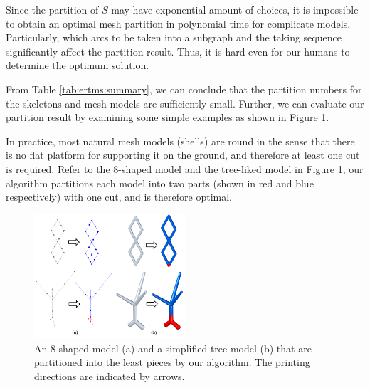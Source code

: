 Since the partition of $S$ may have exponential amount of choices, it is impossible to obtain an optimal mesh partition in polynomial time for complicate models. Particularly, which arcs to be taken into a subgraph and the taking sequence significantly affect the partition result. Thus, it is hard even for our humans to determine the optimum solution. {\color{blue}{In solving such an intricate problem involving various parameters, Monte Carlo Method with a large number of iterations is a good choice. To guarantee that the method can converge to a nice result within limited number of iterations, we apply a training-and-learning procedure, which helps accelerate the searching process. } From Table \ref{tab:ertms:summary}, we can conclude that the partition numbers for the skeletons and mesh models are sufficiently small. Further, we can evaluate our partition result by examining some simple examples as shown in Figure \ref{fig:simpletree}.

In practice, most natural mesh models (shells) are round in the sense that there is no flat platform for supporting it on the ground, and therefore at least one cut is required. Refer to the 8-shaped model and the tree-liked model in Figure \ref{fig:simpletree}, our algorithm partitions each model into two parts (shown in red and blue respectively) with one cut, and is therefore optimal.

\begin{figure}[tbp]
  \centering
  \includegraphics[width=0.5\textwidth]{figs/simpletree.png}
  \caption{\label{fig:simpletree}%
           An 8-shaped model (a) and a simplified tree model (b) that are partitioned into the least pieces by our algorithm. The printing directions are indicated by arrows.}
\end{figure}



}
